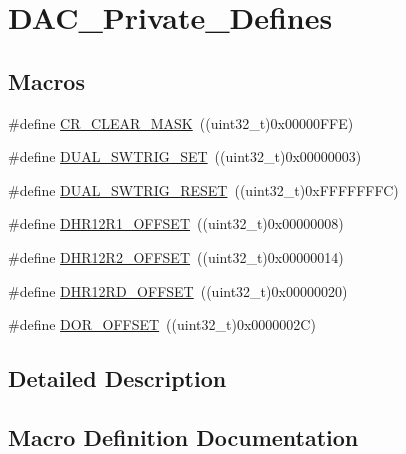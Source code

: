 \hypertarget{group___d_a_c___private___defines}{}\section{D\+A\+C\+\_\+\+Private\+\_\+\+Defines}
\label{group___d_a_c___private___defines}
\subsection*{Macros}
\begin{DoxyCompactItemize}
\item 
\#define \mbox{\hyperlink{group___d_a_c___private___defines_ga8a5812a1d5ced986bb997a4bb7ae697d}{C\+R\+\_\+\+C\+L\+E\+A\+R\+\_\+\+M\+A\+SK}}~((uint32\+\_\+t)0x00000\+F\+F\+E)
\item 
\#define \mbox{\hyperlink{group___d_a_c___private___defines_ga6401668f65168b2b689b49155f380bdd}{D\+U\+A\+L\+\_\+\+S\+W\+T\+R\+I\+G\+\_\+\+S\+ET}}~((uint32\+\_\+t)0x00000003)
\item 
\#define \mbox{\hyperlink{group___d_a_c___private___defines_gacd3ce00f8b25892532af267f26932ed7}{D\+U\+A\+L\+\_\+\+S\+W\+T\+R\+I\+G\+\_\+\+R\+E\+S\+ET}}~((uint32\+\_\+t)0x\+F\+F\+F\+F\+F\+F\+F\+C)
\item 
\#define \mbox{\hyperlink{group___d_a_c___private___defines_gaf1305e3b7cfb0f898678baeab6e91cbf}{D\+H\+R12\+R1\+\_\+\+O\+F\+F\+S\+ET}}~((uint32\+\_\+t)0x00000008)
\item 
\#define \mbox{\hyperlink{group___d_a_c___private___defines_ga157b0fbccea090637eea09172fdd6a39}{D\+H\+R12\+R2\+\_\+\+O\+F\+F\+S\+ET}}~((uint32\+\_\+t)0x00000014)
\item 
\#define \mbox{\hyperlink{group___d_a_c___private___defines_ga2893b0491ec29a95fd061e5e0fa029e3}{D\+H\+R12\+R\+D\+\_\+\+O\+F\+F\+S\+ET}}~((uint32\+\_\+t)0x00000020)
\item 
\#define \mbox{\hyperlink{group___d_a_c___private___defines_ga051bab7263211bd232d13665339c1745}{D\+O\+R\+\_\+\+O\+F\+F\+S\+ET}}~((uint32\+\_\+t)0x0000002\+C)
\end{DoxyCompactItemize}


\subsection{Detailed Description}


\subsection{Macro Definition Documentation}
\mbox{\label{group___d_a_c___private___defines_ga8a5812a1d5ced986bb997a4bb7ae697d}} 
